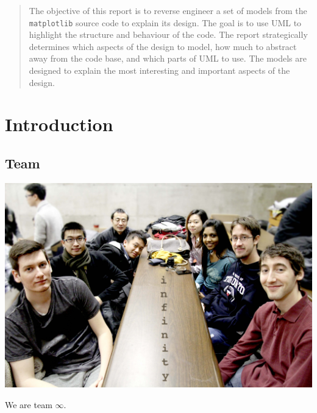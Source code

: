 \documentclass[pdftex,10pt,a4paper]{report}
\begin{document}


\begin{abstract}
The objective of this report is to reverse engineer a set of models from the {\tt matplotlib} source code to explain its design. The goal is to use UML to highlight the structure and behaviour of the code. The report strategically determines which aspects of the design to model, how much to abstract away from the code base, and which parts of UML to use. The models are designed to explain the most interesting and important aspects of the design.
\end{abstract}

\tableofcontents
\listoffigures

\chapter{Introduction}

\section{Team}

  \begin{center}
    \includegraphics[width=1\textwidth]{img/group/group}
  \end{center}
We are team $\infty$.
\newpage
\end{document}
